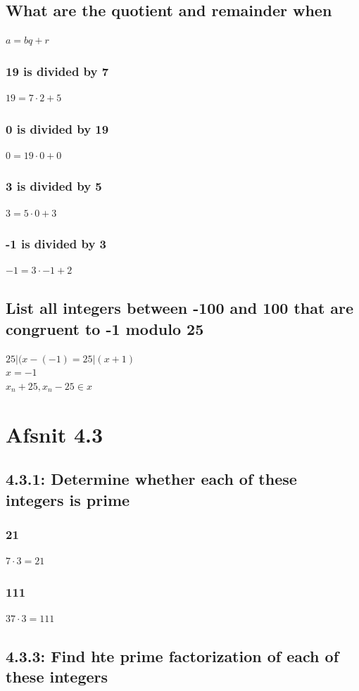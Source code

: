 \documentclass[12pt, a4paper]{report}
\begin{document}
				\subsection{What are the quotient and remainder when}
					$a=bq+r$
					\subsubsection{19 is divided by 7}
						$19=7\cdot 2+5$
					\setcounter{subsubsection}{4}
					\subsubsection{0 is divided by 19}
						$0=19\cdot 0 + 0$
					\subsubsection{3 is divided by 5}
						$3=5\cdot 0 + 3$
					\subsubsection{-1 is divided by 3}
						$-1=3\cdot -1+2$
				\setcounter{subsection}{32}
				\subsection{List all integers between -100 and 100 that are congruent to -1 modulo 25}
					$25|(x-(-1)=25|(x+1)$\\
					$x={-1}$\\
					$x_n+25, x_n-25\in x$
			\section{Afsnit 4.3}
				\subsection{4.3.1: Determine whether each of these integers is prime}
					\subsubsection{21}
						$7\cdot 3 = 21$
					\setcounter{subsubsection}{2}
					\subsubsection{111}
						$37\cdot 3 = 111$
				\setcounter{subsection}{2}
				\subsection{4.3.3: Find hte prime factorization of each of these integers}
\end{document}
